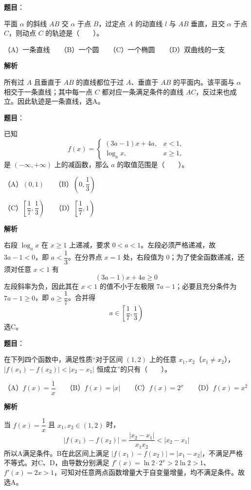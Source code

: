 \begin{answer}

\textbf{题目}：

平面 $\alpha$ 的斜线 $AB$ 交 $\alpha$ 于点 $B$，过定点 $A$ 的动直线 $l$ 与 $AB$ 垂直，且交 $\alpha$ 于点 $C$，则动点 $C$ 的轨迹是\mbox{（　　）}。

（A）一条直线　　（B）一个圆　　（C）一个椭圆　　（D）双曲线的一支

\textbf{解析}

所有过 $A$ 且垂直于 $AB$ 的直线都位于过 $A$、垂直于 $AB$ 的平面内。该平面与 $\alpha$ 相交于一条直线；其中每一点 $C$ 都对应一条满足条件的直线 $AC$，反过来也成立。因此轨迹是一条直线，选A。


\end{answer}
\begin{answer}

\textbf{题目}：

已知
\nopagebreak[4]
\[
f(x)=\begin{cases}
(3a-1)x+4a, & x<1,\\
\log_a x, & x\ge 1,
\end{cases}
\]
是 $(-\infty,+\infty)$ 上的减函数，那么 $a$ 的取值范围是\mbox{（　　）}。

（A）$(0,1)$　　（B）$\left(0,\dfrac13\right)$

（C）$\left[\dfrac17,\dfrac13\right)$　　（D）$\left[\dfrac17,1\right)$

\textbf{解析}

右段 $\log_a x$ 在 $x\ge1$ 上递减，要求 $0<a<1$。左段必须严格递减，故 $3a-1<0$，即 $a<\dfrac13$。在分界点 $x=1$ 处，右段值为 $0$；为了使全函数递减，还须对任意 $x<1$ 有
\nopagebreak[4]
\[
(3a-1)x+4a\ge0
\]
左段斜率为负，因此其在 $x<1$ 的值不小于左极限 $7a-1$；必要且充分条件为 $7a-1\ge0$，即 $a\ge\dfrac17$。合并得
\nopagebreak[4]
\[
a\in\left[\frac17,\frac13\right)
\]
选C。

\gkanswer{答案：C，$a\in\left[\dfrac17,\dfrac13\right)$。}

\end{answer}
\begin{answer}

\textbf{题目}：

在下列四个函数中，满足性质“对于区间 $(1,2)$ 上的任意 $x_1,x_2$（$x_1\ne x_2$），$|f(x_1)-f(x_2)|<|x_2-x_1|$ 恒成立”的只有\mbox{（　　）}。

（A）$f(x)=\dfrac1x$　　（B）$f(x)=|x|$　　（C）$f(x)=2^x$　　（D）$f(x)=x^2$

\textbf{解析}

当 $f(x)=\dfrac1x$ 且 $x_1,x_2\in(1,2)$ 时，
\nopagebreak[4]
\[
|f(x_1)-f(x_2)|=\frac{|x_2-x_1|}{x_1x_2}<|x_2-x_1|
\]
所以A满足条件。B在此区间上满足 $|f(x_1)-f(x_2)|=|x_1-x_2|$，不满足严格不等式。对C、D，由导数分别满足 $f'(x)=\ln2\cdot2^x>2\ln2>1$、$f'(x)=2x>1$，可知对任意两点函数增量大于自变量增量，均不满足条件。故选A。


\end{answer}
